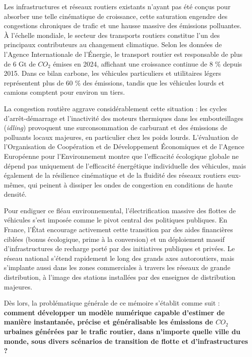 \documentclass[10pt, a4paper]{article}
\begin{document}
Les infrastructures et réseaux routiers existants n'ayant pas été conçus
pour absorber une telle cinématique de croissance, cette saturation
engendre des congestions chroniques de trafic et une hausse massive des
émissions polluantes. À l'échelle mondiale, le secteur des transports
routiers constitue l'un des principaux contributeurs au changement
climatique. Selon les données de l'Agence Internationale de l'Énergie,
le transport routier est responsable de plus de 6 Gt de \(CO_2\) émises
en 2024, affichant une croissance continue de 8 \% depuis 2015. Dans ce
bilan carbone, les véhicules particuliers et utilitaires légers
représentent plus de 60 \% des émissions, tandis que les véhicules
lourds et camions comptent pour environ un tiers.

La congestion routière aggrave considérablement cette situation : les
cycles d'arrêt-démarrage et l'inactivité des moteurs thermiques dans les
embouteillages (\emph{idling}) provoquent une surconsommation de
carburant et des émissions de polluants locaux majeures, en particulier
chez les poids lourds. L'évaluation de l'Organisation de Coopération et
de Développement Économiques et de l'Agence Européenne pour
l'Environnement montre que l'efficacité écologique globale ne dépend pas
uniquement de l'efficacité énergétique individuelle des véhicules, mais
également de la résilience cinématique et de la fluidité des réseaux
routiers eux-mêmes, qui peinent à dissiper les ondes de congestion en
conditions de haute densité.

Pour endiguer ce fléau environnemental, l'électrification massive des
flottes de véhicules s'est imposée comme le pivot central des politiques
publiques. En France, l'État encourage activement cette transition par
des aides financières ciblées (bonus écologique, prime à la conversion)
et un déploiement massif d'infrastructures de recharge porté par des
initiatives publiques et privées. Le réseau national s'étend rapidement
le long des grands axes autoroutiers, mais s'implante aussi dans les
zones commerciales à travers les réseaux de grande distribution, à
l'image des stations installées par des enseignes de distribution
majeures.

Dès lors, la problématique générale de ce mémoire s'établit comme suit :
\textbf{comment développer un modèle numérique capable d'estimer de
manière instantanée, précise et généralisable les émissions de \(CO_2\)
urbaines générées par le trafic routier, dans n'importe quelle ville du
monde, sous divers scénarios de transition de flotte et
d'infrastructures ?}
\end{document}
